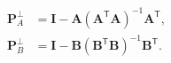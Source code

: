 \begin{align} \mathbf P_A^\perp &= \mathbf I - \mathbf A \left(\mathbf A^\textsf{T} \mathbf A\right)^{-1} \mathbf A^\textsf{T}, \\ \mathbf P_B^\perp &= \mathbf I - \mathbf B \left(\mathbf B^\textsf{T} \mathbf B\right)^{-1} \mathbf B^\textsf{T}. \end{align}

